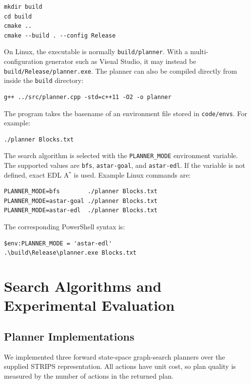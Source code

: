 \begin{verbatim}
mkdir build
cd build
cmake ..
cmake --build . --config Release
\end{verbatim}

On Linux, the executable is normally \texttt{build/planner}.  With a multi-
configuration generator such as Visual Studio, it may instead be
\texttt{build/Release/planner.exe}.  The planner can also be compiled directly
from inside the \texttt{build} directory:

\begin{verbatim}
g++ ../src/planner.cpp -std=c++11 -O2 -o planner
\end{verbatim}

The program takes the basename of an environment file stored in
\texttt{code/envs}.  For example:

\begin{verbatim}
./planner Blocks.txt
\end{verbatim}

The search algorithm is selected with the \texttt{PLANNER\_MODE} environment
variable.  The supported values are \texttt{bfs}, \texttt{astar-goal}, and
\texttt{astar-edl}.  If the variable is not defined, exact EDL A$^\ast$ is used.
Example Linux commands are:

\begin{verbatim}
PLANNER_MODE=bfs        ./planner Blocks.txt
PLANNER_MODE=astar-goal ./planner Blocks.txt
PLANNER_MODE=astar-edl  ./planner Blocks.txt
\end{verbatim}

The corresponding PowerShell syntax is:

\begin{verbatim}
$env:PLANNER_MODE = 'astar-edl'
.\build\Release\planner.exe Blocks.txt
\end{verbatim}

\section{Search Algorithms and Experimental Evaluation}
\label{sec:planner-evaluation}

\subsection{Planner Implementations}

We implemented three forward state-space graph-search planners over the supplied
STRIPS representation.  All actions have unit cost, so plan quality is measured
by the number of actions in the returned plan.

